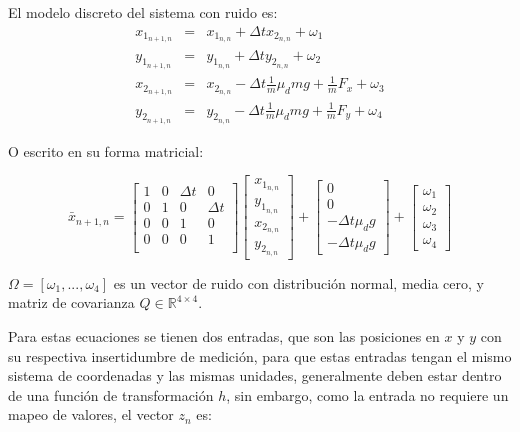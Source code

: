 El modelo discreto del sistema con ruido es:
\begin{eqnarray*}
x_{1_{n+1,n}} &=& x_{1_{n,n}} + \Delta t x_{2_{n,n}} + \omega_1\\ %
y_{1_{n+1,n}} &=& y_{1_{n,n}} + \Delta t y_{2_{n,n}} + \omega_2\\ %
x_{2_{n+1,n}} &=& x_{2_{n,n}} - \Delta t \frac{1}{m}\mu_d m g + \frac{1}{m} F_x + \omega_3\\ %
y_{2_{n+1,n}} &=& y_{2_{n,n}} - \Delta t \frac{1}{m}\mu_d m g + \frac{1}{m} F_y + \omega_4 %
\end{eqnarray*}

O escrito en su forma matricial:

\begin{equation}
\bar{x}_{n+1,n} =
\begin{bmatrix}
1 & 0 & \Delta t & 0\\ 
0 & 1 & 0 & \Delta t\\
0 & 0 & 1 & 0\\
0 & 0 & 0 & 1\\
\end{bmatrix}
\begin{bmatrix}
x_{1_{n,n}}\\ 
y_{1_{n,n}}\\
x_{2_{n,n}}\\
y_{2_{n,n}}
\end{bmatrix}
+
\begin{bmatrix}
0 \\
0 \\
- \Delta t \mu_d g \\
- \Delta t \mu_d g 
\end{bmatrix}
+
\begin{bmatrix}
\omega_1 \\ 
\omega_2 \\
\omega_3 \\
\omega_4
\end{bmatrix}
\end{equation}	

$\Omega = [\omega_1, ... ,\omega_4]$ es un vector de ruido con distribución normal, media cero, y matriz de covarianza $Q\in \mathbb{R}^{4\times 4}$.

Para estas ecuaciones se tienen dos entradas, que son las posiciones en $x$ y $y$ con su respectiva insertidumbre de medición, para que estas entradas tengan el mismo sistema de coordenadas y las mismas unidades, generalmente deben estar dentro de una función de transformación $h$, sin embargo, como la entrada no requiere un mapeo de valores, el vector $z_n$ es:

